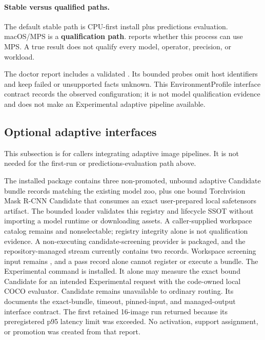 \paragraph{Stable versus qualified paths.}
The default stable path is CPU-first install plus predictions evaluation.
macOS/MPS is a \textbf{qualification path}.
 reports whether this process can use MPS.
A true result does not qualify every model, operator, precision, or workload.

The doctor report includes a validated .
Its bounded probes omit host identifiers and keep failed or unsupported facts
unknown. This EnvironmentProfile interface contract records the observed
configuration; it is not model qualification evidence and does not make an
Experimental adaptive pipeline available.

\subsection{Optional adaptive interfaces}
This subsection is for callers integrating adaptive image pipelines. It is not
needed for the first-run or predictions-evaluation path above.

The installed package contains three non-promoted, unbound adaptive Candidate bundle
records matching the existing model zoo, plus one bound Torchvision Mask R-CNN
Candidate that consumes an exact user-prepared local safetensors artifact. The bounded loader validates this registry and lifecycle
SSOT without importing a model runtime or downloading assets. A caller-supplied workspace catalog remains
 and nonselectable; registry integrity alone is not
qualification evidence. A non-executing candidate-screening provider is packaged,
and the repository-managed stream currently contains two  records.
Workspace screening input remains
, and a pass record alone cannot register or execute a
bundle. The Experimental 
command is installed. It alone may measure the exact bound Candidate for an intended
Experimental request with the code-owned local COCO evaluator. Candidate remains
unavailable to ordinary routing. Its  documents
the exact-bundle, timeout, pinned-input, and managed-output interface contract.
The first retained 16-image run returned  because its preregistered
p95 latency limit was exceeded. No activation, support assignment, or promotion
was created from that report.


